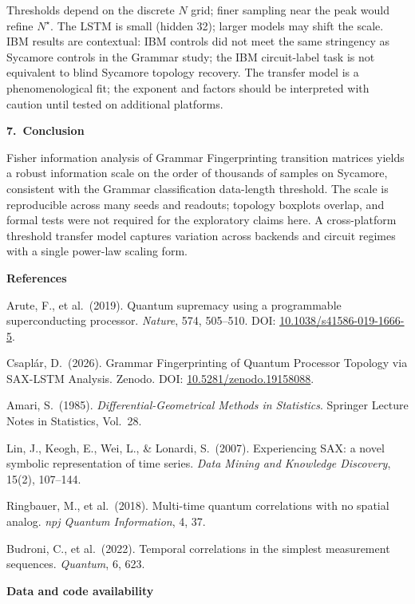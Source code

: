 \documentclass[11pt,a4paper]{article}
\begin{document}
Thresholds depend on the discrete $N$ grid; finer sampling near the peak would refine $N^\star$. The LSTM is small (hidden 32); larger models may shift the scale. IBM results are contextual: IBM controls did not meet the same stringency as Sycamore controls in the Grammar study; the IBM circuit-label task is not equivalent to blind Sycamore topology recovery. The transfer model is a phenomenological fit; the exponent and factors should be interpreted with caution until tested on additional platforms.

\vspace{0.5em}
\textbf{7.\ Conclusion}

Fisher information analysis of Grammar Fingerprinting transition matrices yields a robust information scale on the order of thousands of samples on Sycamore, consistent with the Grammar classification data-length threshold. The scale is reproducible across many seeds and readouts; topology boxplots overlap, and formal tests were not required for the exploratory claims here. A cross-platform threshold transfer model captures variation across backends and circuit regimes with a single power-law scaling form.

\vspace{0.6em}
\textbf{References}

Arute, F., et al.\ (2019). Quantum supremacy using a programmable superconducting processor. \textit{Nature}, 574, 505--510. DOI: \href{https://doi.org/10.1038/s41586-019-1666-5}{10.1038/s41586-019-1666-5}.

Csapl\'ar, D.\ (2026). Grammar Fingerprinting of Quantum Processor Topology via SAX-LSTM Analysis. Zenodo. DOI: \href{https://doi.org/10.5281/zenodo.19158088}{10.5281/zenodo.19158088}.

Amari, S.\ (1985). \textit{Differential-Geometrical Methods in Statistics}. Springer Lecture Notes in Statistics, Vol.~28.

Lin, J., Keogh, E., Wei, L., \& Lonardi, S.\ (2007). Experiencing SAX: a novel symbolic representation of time series. \textit{Data Mining and Knowledge Discovery}, 15(2), 107--144.

Ringbauer, M., et al.\ (2018). Multi-time quantum correlations with no spatial analog. \textit{npj Quantum Information}, 4, 37.

Budroni, C., et al.\ (2022). Temporal correlations in the simplest measurement sequences. \textit{Quantum}, 6, 623.

\vspace{0.5em}
\textbf{Data and code availability}
\end{document}
